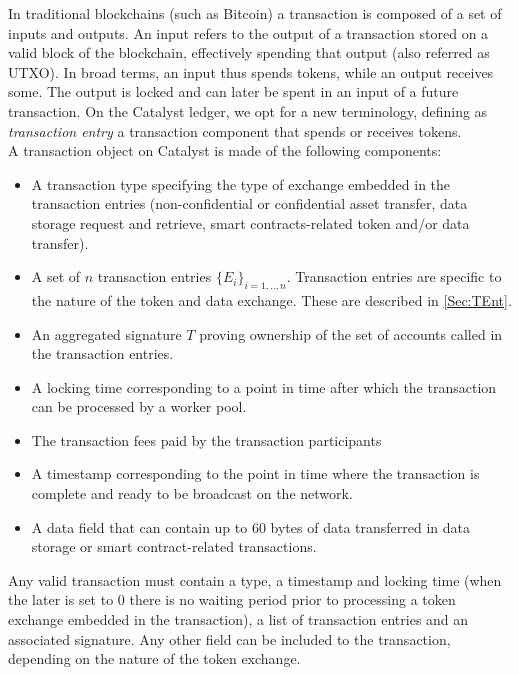 In traditional blockchains (such as Bitcoin) a transaction is composed of a set of inputs and outputs. An input refers to the output of a transaction stored on a valid block of the blockchain, effectively spending that output (also referred as UTXO). In broad terms, an input thus spends tokens, while an output receives some. The output is locked and can later be spent in an input of a future transaction. On the Catalyst ledger, we opt for a new terminology, defining as \textit{transaction entry} a transaction component that spends or receives tokens.\\

A transaction object on Catalyst is made of the following components:

\begin{itemize}
\item A transaction type specifying the type of exchange embedded in the transaction entries (non-confidential or confidential asset transfer, data storage request and retrieve, smart contracts-related token and/or data transfer).
\item A set of $n$ transaction entries $\{E_i\}_{i=1,..,n}$. Transaction entries are specific to the nature of the token and data exchange. These are described in \ref{Sec:TEnt}.
\item An aggregated signature $T$ proving ownership of the set of accounts called in the transaction entries.
\item A locking time corresponding to a point in time after which the transaction can be processed by a worker pool.
\item The transaction fees paid by the transaction participants
\item A timestamp corresponding to the point in time where the transaction is complete and ready to be broadcast on the network.
\item A data field that can contain up to 60 bytes of data transferred in data storage or smart contract-related transactions. 
\end{itemize}

Any valid transaction must contain a type, a timestamp and locking time (when the later is set to 0 there is no waiting period prior to processing a token exchange embedded in the transaction), a list of transaction entries and an associated signature. Any other field can be included to the transaction, depending on the nature of the token exchange. 